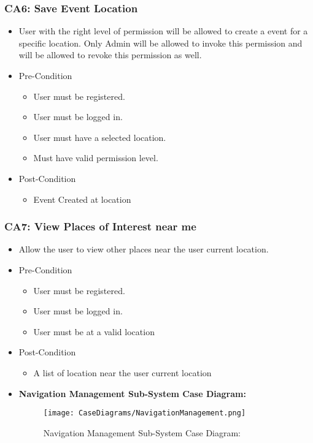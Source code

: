 \documentclass[12pt,a4paper]{article}
\begin{document}
		\subsubsection{CA6: Save Event Location}
			\begin{itemize}
				\item User with the right level of permission will be allowed to create a event for a specific location. Only Admin will be allowed to invoke this permission and will be allowed to revoke this permission as well.
				\item Pre-Condition
					\begin{itemize}
						\item User must be registered.
						\item User must be logged in.
						\item User must have a selected location.
						\item Must have valid permission level.
					\end{itemize}
				\item Post-Condition
					\begin{itemize}
						\item Event Created at location
					\end{itemize}
			\end{itemize}
		\subsubsection{CA7: View Places of Interest near me}
			\begin{itemize}
				\item Allow the user to view other places near the user current location.
				\item Pre-Condition
					\begin{itemize}
						\item User must be registered.
						\item User must be logged in.
						\item User must be at a valid location
					\end{itemize}
				\item Post-Condition
					\begin{itemize}
						\item A list of location near the user current location
					\end{itemize}
				\item \textbf{Navigation Management Sub-System Case Diagram:}
				\begin{figure}[H]
					\texttt{[image: CaseDiagrams/NavigationManagement.png]}
					\caption{Navigation Management Sub-System Case Diagram:}
				\end{figure}
			\end{itemize}
\end{document}
